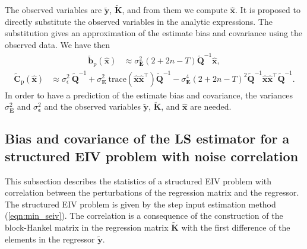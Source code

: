 The observed variables are $\widetilde{\mathbf{y}}$, $\widetilde{\mathbf{K}}$, and from them we compute $\widehat{\mathbf{x}}$.
It is proposed to directly substitute the observed variables in the analytic expressions.
The substitution gives an approximation of the estimate bias and covariance using the observed data.
We have then
\begin{equation} \begin{aligned} \widetilde{\mathbf{b}}_{\mathrm{p}} \left( \widehat{\mathbf{x}} \right) & \approx \sigma_{\mathbf{E}}^2 \left( 2 + 2n - T \right) \widetilde{\mathbf{Q}}^{-1} \widehat{\mathbf{x}} , \end{aligned} \label{eqn:biasEuST} \end{equation}
\begin{equation} \begin{aligned} \widetilde{\mathbf{C}}_{\mathrm{p}} \left( \widehat{\mathbf{x}} \right) & \approx \sigma_\epsilon^2 \ \widetilde{\mathbf{Q}}^{-1} + \sigma_{\mathbf{E}}^2 \ \mathrm{trace} \left( \widehat{\mathbf{x}} \widehat{\mathbf{x}}^\top \right) \widetilde{\mathbf{Q}}^{-1} - \sigma_{\mathbf{E}}^4 \left( 2 + 2n - T \right)^2 \widetilde{\mathbf{Q}}^{-1} \widehat{\mathbf{x}} \widehat{\mathbf{x}}^\top \widetilde{\mathbf{Q}}^{-1} . \end{aligned} \label{eqn:varEuST} \end{equation}
In order to have a prediction of the estimate bias and covariance, the variances $\sigma_{\mathbf{E}}^2$ and $\sigma_{\bm{\epsilon}}^2$ and the observed variables $\widetilde{\mathbf{y}}$, $\widetilde{\mathbf{K}}$, and $\widehat{\mathbf{x}}$ are needed.


\subsection{Bias and covariance of the LS estimator for a structured EIV problem with noise correlation}

This subsection describes the statistics of a structured EIV problem with correlation between the perturbations of the regression matrix and the regressor. 
The structured EIV problem is given by the step input estimation method (\ref{eqn:min_seiv}).
The correlation is a consequence of the construction of the block-Hankel matrix in the regression matrix $\widetilde{\mathbf{K}}$ with the first difference of the elements in the regressor $\widetilde{\mathbf{y}}$.

